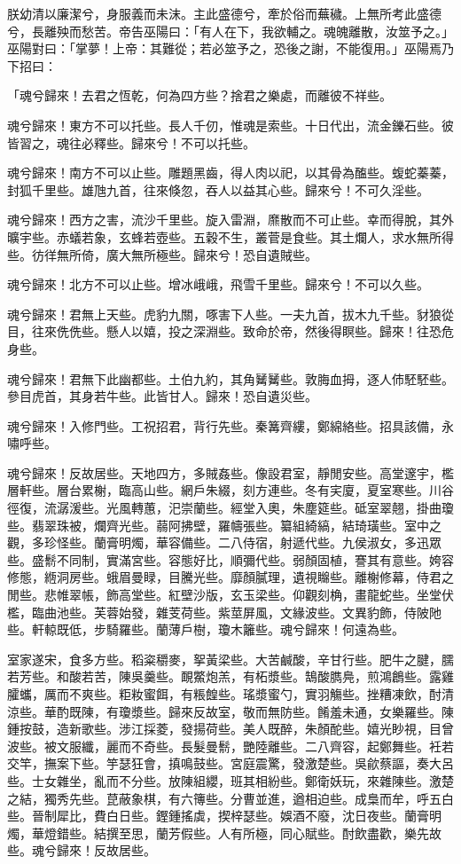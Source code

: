 
\begin{pinyinscope}
朕幼清以廉潔兮，身服義而未沫。主此盛德兮，牽於俗而蕪穢。上無所考此盛德兮，長離殃而愁苦。帝告巫陽曰：「有人在下，我欲輔之。魂魄離散，汝筮予之。」巫陽對曰：「掌夢！上帝：其難從；若必筮予之，恐後之謝，不能復用。」巫陽焉乃下招曰：

「魂兮歸來！去君之恆乾，何為四方些？捨君之樂處，而離彼不祥些。

魂兮歸來！東方不可以托些。長人千仞，惟魂是索些。十日代出，流金鑠石些。彼皆習之，魂往必釋些。歸來兮！不可以托些。

魂兮歸來！南方不可以止些。雕題黑齒，得人肉以祀，以其骨為醢些。蝮蛇蓁蓁，封狐千里些。雄虺九首，往來倏忽，吞人以益其心些。歸來兮！不可久淫些。

魂兮歸來！西方之害，流沙千里些。旋入雷淵，爢散而不可止些。幸而得脫，其外曠宇些。赤蟻若象，玄蜂若壺些。五穀不生，叢菅是食些。其土爛人，求水無所得些。彷徉無所倚，廣大無所極些。歸來兮！恐自遺賊些。

魂兮歸來！北方不可以止些。增冰峨峨，飛雪千里些。歸來兮！不可以久些。

魂兮歸來！君無上天些。虎豹九關，啄害下人些。一夫九首，拔木九千些。豺狼從目，往來侁侁些。懸人以嬉，投之深淵些。致命於帝，然後得瞑些。歸來！往恐危身些。

魂兮歸來！君無下此幽都些。土伯九約，其角觺觺些。敦脢血拇，逐人伂駓駓些。參目虎首，其身若牛些。此皆甘人。歸來！恐自遺災些。

魂兮歸來！入修門些。工祝招君，背行先些。秦篝齊縷，鄭綿絡些。招具該備，永嘯呼些。

魂兮歸來！反故居些。天地四方，多賊姦些。像設君室，靜閒安些。高堂邃宇，檻層軒些。層台累榭，臨高山些。網戶朱綴，刻方連些。冬有宎廈，夏室寒些。川谷徑復，流潺湲些。光風轉蕙，汜崇蘭些。經堂入奧，朱塵筵些。砥室翠翹，掛曲瓊些。翡翠珠被，爛齊光些。蒻阿拂壁，羅幬張些。纂組綺縞，結琦璜些。室中之觀，多珍怪些。蘭膏明燭，華容備些。二八侍宿，射遞代些。九侯淑女，多迅眾些。盛鬋不同制，實滿宮些。容態好比，順彌代些。弱顏固植，謇其有意些。姱容修態，緪洞房些。蛾眉曼睩，目騰光些。靡顏膩理，遺視矊些。離榭修幕，侍君之閒些。悲帷翠帳，飾高堂些。紅壁沙版，玄玉梁些。仰觀刻桷，畫龍蛇些。坐堂伏檻，臨曲池些。芙蓉始發，雜芰荷些。紫莖屏風，文緣波些。文異豹飾，侍陂阤些。軒輬既低，步騎羅些。蘭薄戶樹，瓊木籬些。魂兮歸來！何遠為些。

室家遂宋，食多方些。稻粢穱麥，挐黃梁些。大苦鹹酸，辛甘行些。肥牛之腱，臑若芳些。和酸若苦，陳吳羹些。靦鱉炮羔，有柘漿些。鵠酸臇鳧，煎鴻鶬些。露雞臛蠵，厲而不爽些。粔籹蜜餌，有粻餭些。瑤漿蜜勺，實羽觴些。挫糟凍飲，酎清涼些。華酌既陳，有瓊漿些。歸來反故室，敬而無防些。餚羞未通，女樂羅些。陳鍾按鼓，造新歌些。涉江採菱，發揚荷些。美人既醉，朱顏酡些。嬉光眇視，目曾波些。被文服纖，麗而不奇些。長髮曼鬋，艷陸離些。二八齊容，起鄭舞些。衽若交竿，撫案下些。竽瑟狂會，搷鳴鼓些。宮庭震驚，發激楚些。吳歈蔡謳，奏大呂些。士女雜坐，亂而不分些。放陳組纓，班其相紛些。鄭衛妖玩，來雜陳些。激楚之結，獨秀先些。菎蔽象棋，有六簙些。分曹並進，遒相迫些。成梟而牟，呼五白些。晉制犀比，費白日些。鏗鍾搖虡，揳梓瑟些。娛酒不廢，沈日夜些。蘭膏明燭，華燈錯些。結撰至思，蘭芳假些。人有所極，同心賦些。酎飲盡歡，樂先故些。魂兮歸來！反故居些。


\end{pinyinscope}
